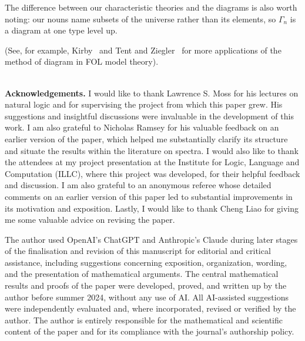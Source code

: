 \documentclass[12pt, reqno]{amsart}
\theoremstyle{definition}
\theoremstyle{remark}
\numberwithin{equation}{section}
\begin{document}
The difference between our characteristic theories and the diagrams is also worth noting: our nouns name subsets of the universe rather than
its elements, so $\Gamma_n$ is a diagram at one type level up.


(See, for example, Kirby~\cite{MT} and Tent and Ziegler~\cite{MT2} for more applications of the method of diagram in FOL model theory).

\hfill \\ 

{\bf Acknowledgements.} I would like to thank Lawrence S. Moss for his lectures on natural logic and for supervising the project from which this paper grew. His suggestions and insightful discussions were invaluable in the development of this work. I am also grateful to Nicholas Ramsey for his valuable feedback on an earlier version of the paper, which helped me substantially clarify its structure and situate the results within the literature on spectra. I would also like to thank the attendees at my project presentation at the Institute for Logic, Language and Computation (ILLC), where this project was developed, for their helpful feedback and discussion. I am also grateful to an anonymous referee whose detailed comments on an earlier version of this paper led to substantial improvements in its motivation and exposition. Lastly, I would like to thank Cheng Liao for giving me some valuable advice on revising the paper. 

\medskip
{}
The author used OpenAI's ChatGPT and Anthropic's Claude during later stages of the finalisation and revision of this manuscript for editorial and critical assistance, including suggestions concerning exposition, organization, wording, and the presentation of mathematical arguments. The central mathematical results and proofs of the paper were developed, proved, and written up by the author before summer 2024, without any use of AI. All AI-assisted suggestions were independently evaluated and, where incorporated, revised or verified by the author. The author is entirely responsible for the mathematical and scientific content of the paper and for its compliance with the journal's authorship policy.


\end{document}
